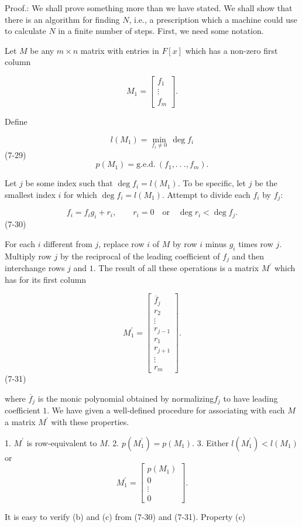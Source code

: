 Proof.: We shall prove something more than we have stated. We shall show that there is an algorithm for finding \(N\), i.e., a prescription which a machine could use to calculate \(N\) in a finite number of steps. First, we need some notation.

Let \(M\) be any \(m\times n\) matrix with entries in \(F[x]\) which has a non-zero first column

\[M_{1}=\begin{bmatrix}f_{1}\\ \vdots\\ f_{m}\end{bmatrix}.\]

Define

\[l(M_{1}) = \min_{f_{i}\neq 0}\,\deg f_{i}\] (7-29) \[p(M_{1}) = \text{g.e.d.}\ (f_{1},.\ .\ .,f_{m}).\]

Let \(j\) be some index such that \(\deg f_{i}=l(M_{1})\). To be specific, let \(j\) be the smallest index \(i\) for which \(\deg f_{i}=l(M_{1})\). Attempt to divide each \(f_{i}\) by \(f_{j}\):

\[f_{i}=f_{i}g_{i}+r_{i},\qquad r_{i}=0\quad\text{or}\quad\deg r_{i}<\deg f_{j}.\] (7-30)

For each \(i\) different from \(j\), replace row \(i\) of \(M\) by row \(i\) minus \(g_{i}\) times row \(j\). Multiply row \(j\) by the reciprocal of the leading coefficient of \(f_{j}\) and then interchange rows \(j\) and \(1\). The result of all these operations is a matrix \(M^{\prime}\) which has for its first column

\[M^{\prime}_{1}=\begin{bmatrix}\overline{f}_{j}\\ r_{2}\\ \vdots\\ r_{j-1}\\ r_{1}\\ r_{j+1}\\ \vdots\\ r_{m}\end{bmatrix}.\] (7-31)

where \(\overline{f}_{j}\) is the monic polynomial obtained by normalizing\(f_{j}\) to have leading coefficient \(1\). We have given a well-defined procedure for associating with each \(M\) a matrix \(M^{\prime}\) with these properties.

1. \(M^{\prime}\) is row-equivalent to \(M\).
2. \(p(M^{\prime}_{1})=p(M_{1})\).
3. Either \(l(M^{\prime}_{1})<l(M_{1})\) or \[M^{\prime}_{1}=\begin{bmatrix}p(M_{1})\\ 0\\ \vdots\\ 0\end{bmatrix}.\]

It is easy to verify (b) and (c) from (7-30) and (7-31). Property (c) 
